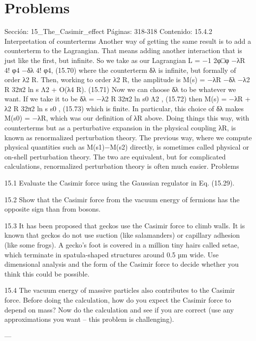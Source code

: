 \section*{Problems}
Sección: 15_The_Casimir_effect
Páginas: 318-318
Contenido:
15.4.2 Interpretation of counterterms
Another way of getting the same result is to add a counterterm to the Lagrangian. That
means adding another interaction that is just like the ﬁrst, but inﬁnite. So we take as our
Lagrangian
L = −1
2φ□φ −λR
4! φ4 −δλ
4! φ4,
(15.70)
where the counterterm δλ is inﬁnite, but formally of order λ2
R. Then, working to order λ2
R,
the amplitude is
M(s) = −λR −δλ −λ2
R
32π2 ln s
Λ2 + O(λ4
R).
(15.71)
Now we can choose δλ to be whatever we want. If we take it to be
δλ = −λ2
R
32π2 ln s0
Λ2 ,
(15.72)
then
M(s) = −λR + λ2
R
32π2 ln s
s0
,
(15.73)
which is ﬁnite. In particular, this choice of δλ makes M(s0) = −λR, which was our
deﬁnition of λR above.
Doing things this way, with counterterms but as a perturbative expansion in the physical
coupling λR, is known as renormalized perturbation theory. The previous way, where we
compute physical quantities such as M(s1)−M(s2) directly, is sometimes called physical
or on-shell perturbation theory. The two are equivalent, but for complicated calculations,
renormalized perturbation theory is often much easier.
Problems

15.1 Evaluate the Casimir force using the Gaussian regulator in Eq. (15.29).

15.2 Show that the Casimir force from the vacuum energy of fermions has the opposite
sign than from bosons.

15.3 It has been proposed that geckos use the Casimir force to climb walls. It is known
that geckos do not use suction (like salamanders) or capillary adhesion (like some
frogs). A gecko’s foot is covered in a million tiny hairs called setae, which terminate
in spatula-shaped structures around 0.5 µm wide. Use dimensional analysis and the
form of the Casimir force to decide whether you think this could be possible.

15.4 The vacuum energy of massive particles also contributes to the Casimir force. Before
doing the calculation, how do you expect the Casimir force to depend on mass? Now
do the calculation and see if you are correct (use any approximations you want – this
problem is challenging).


---

